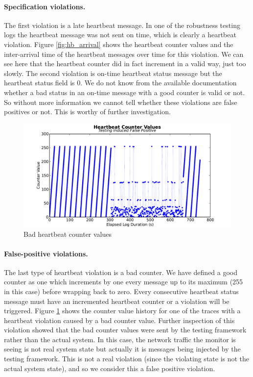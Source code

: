 \paragraph{Specification violations.}
The first violation is a late heartbeat message. In one of the robustness testing logs the heartbeat message was not sent on time, which is clearly a heartbeat violation. Figure \ref{fig:hb_arrival} shows the heartbeat counter values and the inter-arrival time of the heartbeat messages over time for this violation. We can see here that the heartbeat counter did in fact increment in a valid way, just too slowly. 
The second violation is on-time heartbeat status message but the heartbeat status field is 0. 
We do not know from the available documentation whether a bad status in an on-time message with a good counter is valid or not. So without more information we cannot tell whether these violations are false positives or not. This is worthy of further investigation.


\begin{figure}[t]
\includegraphics[width=4.5in]{img/hb2}
\caption{Bad heartbeat counter values \label{fig:hb_badcounter}}
\end{figure}

\paragraph{False-positive violations.}
The last type of heartbeat violation is a bad counter. 
We have defined a good counter as one which increments by one every message up to its maximum (255 in this case) before wrapping back to zero.
Every consecutive heartbeat status message must have an incremented heartbeat counter or a violation will be triggered. Figure \ref{fig:hb_badcounter} shows the counter value history for one of the traces with a heartbeat violation caused by a bad counter value.
%
Further inspection of this violation showed that the bad counter values were sent by the testing framework rather than the actual system. In this case, the network traffic the monitor is seeing is not real system state but actually it is messages being injected by the testing framework. This is not a real violation (since the violating state is not the actual system state), and so we consider this a false positive violation.



